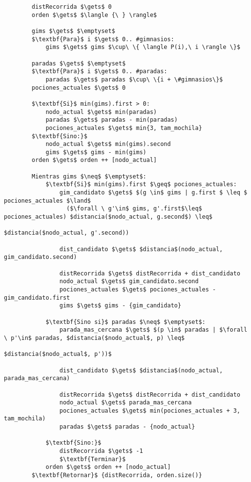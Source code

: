         \begin{lstlisting}
        distRecorrida $\gets$ 0
        orden $\gets$ $\langle {\ } \rangle$

        gims $\gets$ $\emptyset$
        $\textbf{Para}$ i $\gets$ 0.. #gimnasios:
            gims $\gets$ gims $\cup\ \{ \langle P(i),\ i \rangle \}$

        paradas $\gets$ $\emptyset$
        $\textbf{Para}$ i $\gets$ 0.. #paradas:
            paradas $\gets$ paradas $\cup\ \{i + \#gimnasios\}$
        pociones_actuales $\gets$ 0

        $\textbf{Si}$ min(gims).first > 0:
            nodo_actual $\gets$ min(paradas)
            paradas $\gets$ paradas - min(paradas)
            pociones_actuales $\gets$ min{3, tam_mochila}
        $\textbf{Sino:}$
            nodo_actual $\gets$ min(gims).second
            gims $\gets$ gims - min(gims)
        orden $\gets$ orden ++ [nodo_actual]

        Mientras gims $\neq$ $\emptyset$:
            $\textbf{Si}$ min(gims).first $\geq$ pociones_actuales:
                gim_candidato $\gets$ $(g \in$ gims | g.first $ \leq $ pociones_actuales $\land$
                  ($\forall \ g'\in$ gims, g'.first$\leq$ pociones_actuales) $distancia($nodo_actual, g.second$) \leq$
                                                            $distancia($nodo_actual, g'.second))

                dist_candidato $\gets$ $distancia$(nodo_actual, gim_candidato.second)

                distRecorrida $\gets$ distRecorrida + dist_candidato
                nodo_actual $\gets$ gim_candidato.second
                pociones_actuales $\gets$ pociones_actuales - gim_candidato.first
                gims $\gets$ gims - {gim_candidato}

            $\textbf{Sino si}$ paradas $\neq$ $\emptyset$:
                parada_mas_cercana $\gets$ $(p \in$ paradas | $\forall \ p'\in$ paradas, $distancia($nodo_actual$, p) \leq$
                                                                 $distancia($nodo_actual$, p'))$

                dist_candidato $\gets$ $distancia$(nodo_actual, parada_mas_cercana)

                distRecorrida $\gets$ distRecorrida + dist_candidato
                nodo_actual $\gets$ parada_mas_cercana
                pociones_actuales $\gets$ min(pociones_actuales + 3, tam_mochila)
                paradas $\gets$ paradas - {nodo_actual}

            $\textbf{Sino:}$
                distRecorrida $\gets$ -1
                $\textbf{Terminar}$
            orden $\gets$ orden ++ [nodo_actual]
        $\textbf{Retornar}$ {distRecorrida, orden.size()}
        \end{lstlisting}

